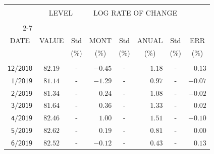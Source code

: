 \documentclass[11pt,a4paper]{article}
\begin{document}
\noindent\begin{minipage}[t]{0.54\textwidth}\vspace*{0pt}\small
\begin{tabular}{rccrcrcr}
\hline
\multicolumn{1}{|c|}{} & \multicolumn{2}{c|}{} & \multicolumn{4}{c}{} & \multicolumn{1}{|c|}{}\vspace{-.10in}\\
\multicolumn{1}{|c|}{} & \multicolumn{2}{c|}{LEVEL} & \multicolumn{4}{c}{LOG RATE OF CHANGE} & \multicolumn{1}{|c|}{}\\
\multicolumn{1}{|c|}{} & \multicolumn{2}{c|}{} & \multicolumn{4}{c}{} & \multicolumn{1}{|c|}{}\vspace{-.10in}\\ \cline{2-7}
\multicolumn{1}{|c|}{} & \multicolumn{1}{c|}{} & \multicolumn{1}{c|}{} & \multicolumn{1}{c|}{} & \multicolumn{1}{c|}{} & \multicolumn{1}{c|}{} & \multicolumn{1}{c|}{} & \multicolumn{1}{c|}{}\vspace{-.05in}\\
\multicolumn{1}{|c|}{DATE} & \multicolumn{1}{c|}{VALUE} & \multicolumn{1}{c|}{Std} & \multicolumn{1}{c|}{MONT} & \multicolumn{1}{c|}{Std} & \multicolumn{1}{c|}{ANUAL} & \multicolumn{1}{c|}{Std} & \multicolumn{1}{c|}{ERR}\\
\multicolumn{1}{|c|}{} & \multicolumn{1}{c|}{} & \multicolumn{1}{c|}{($\%$)} & \multicolumn{1}{c|}{($\%$)} & \multicolumn{1}{c|}{($\%$)} & \multicolumn{1}{c|}{($\%$)} & \multicolumn{1}{c|}{($\%$)} & \multicolumn{1}{c|}{($\%$)}\\
\hline \\
$\mathsf{12/2018}$ & $\mathsf{82.19}$ & - & $\mathsf{-0.45}$ & - & $\mathsf{1.18}$ & - & $\mathsf{0.13}$ \\
$\mathsf{1/2019}$ & $\mathsf{81.14}$ & - & $\mathsf{-1.29}$ & - & $\mathsf{0.97}$ & - & $\mathsf{-0.07}$ \\
$\mathsf{2/2019}$ & $\mathsf{81.34}$ & - & $\mathsf{0.24}$ & - & $\mathsf{1.08}$ & - & $\mathsf{-0.02}$ \\
$\mathsf{3/2019}$ & $\mathsf{81.64}$ & - & $\mathsf{0.36}$ & - & $\mathsf{1.33}$ & - & $\mathsf{0.02}$ \\
$\mathsf{4/2019}$ & $\mathsf{82.46}$ & - & $\mathsf{1.00}$ & - & $\mathsf{1.51}$ & - & $\mathsf{-0.10}$ \\
$\mathsf{5/2019}$ & $\mathsf{82.62}$ & - & $\mathsf{0.19}$ & - & $\mathsf{0.81}$ & - & $\mathsf{0.00}$ \\
$\mathsf{6/2019}$ & $\mathsf{82.52}$ & - & $\mathsf{-0.12}$ & - & $\mathsf{0.43}$ & - & $\mathsf{0.13}$ \\

\end{tabular}
\end{minipage}
\end{document}
